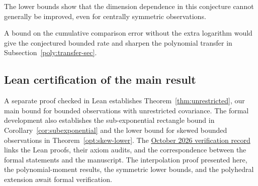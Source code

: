 \documentclass[11pt,letterpaper]{article}
\theoremstyle{remark}
\begin{document}
The lower bounds show that the dimension dependence in this conjecture
cannot generally be improved, even for centrally symmetric observations.


A bound on the cumulative comparison error
without the extra logarithm would give the conjectured bounded rate
and sharpen the polynomial transfer in Subsection~\ref{poly:transfer-sec}.

\subsection{Lean certification of the main result}\label{sec:lean-certification}

A separate proof checked in Lean establishes Theorem~\ref{thm:unrestricted},
our main bound for bounded observations with unrestricted covariance.
The formal development also establishes the sub-exponential rectangle
bound in Corollary~\ref{cor:subexponential} and the lower bound for
skewed bounded observations in Theorem~\ref{opt:skew-lower}. The
\href{https://github.com/VC2015/HDCLTs/blob/bbf1ab99c733a398c181ca8c9f5a243a41f258c6/verification/2026-10-21-companion-results/README.md}{October 2026 verification record}
links the Lean proofs, their axiom audits, and the correspondence between
the formal statements and the manuscript. The interpolation proof
presented here, the polynomial-moment results, the symmetric lower
bounds, and the polyhedral extension await formal verification.
\end{document}
